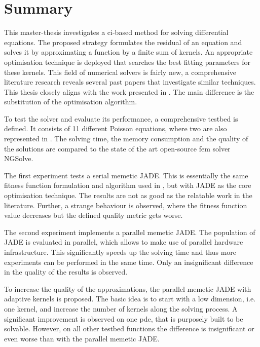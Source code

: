 \documentclass[./\jobname.tex]{subfiles}
\begin{document}
\section{Summary}

This master-thesis investigates a \gls{ci}-based method for solving differential equations. The proposed strategy formulates the residual of an equation and solves it by approximating a function by a finite sum of kernels. An appropriate optimisation technique is deployed that searches the best fitting parameters for these kernels. This field of numerical solvers is fairly new, a comprehensive literature research reveals several past papers that investigate similar techniques. This thesis closely aligns with the work presented in \cite{chaquet_using_2019}. The main difference is the substitution of the optimisation algorithm. 

To test the solver and evaluate its performance, a comprehensive testbed is defined. It consists of 11 different Poisson equations, where two are also represented in \cite{chaquet_using_2019}. The solving time, the memory consumption and the quality of the solutions are compared to the state of the art open-source \gls{fem} solver NGSolve. 

The first experiment tests a serial memetic JADE. This is essentially the same fitness function formulation and algorithm used in \cite{chaquet_using_2019}, but with JADE as the core optimisation technique. The results are not as good as the relatable work in the literature. Further, a strange behaviour is observed, where the fitness function value decreases but the defined quality metric gets worse. 

The second experiment implements a parallel memetic JADE. The population of JADE is evaluated in parallel, which allows to make use of parallel hardware infrastructure. This significantly speeds up the solving time and thus more experiments can be performed in the same time. Only an insignificant difference in the quality of the results is observed. 

To increase the quality of the approximations, the parallel memetic JADE with adaptive kernels is proposed. The basic idea is to start with a low dimension, i.e. one kernel, and increase the number of kernels along the solving process. A significant improvement is observed on one \gls{pde}, that is purposely built to be solvable. However, on all other testbed functions the difference is insignificant or even worse than with the parallel memetic JADE. 
\end{document}
